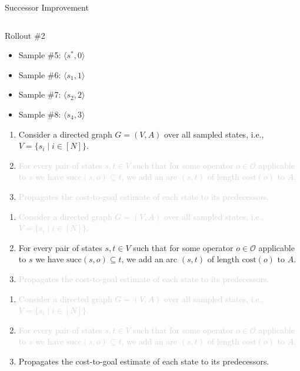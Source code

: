 \documentclass[10pt]{beamer}
\begin{document}
\begin{frame}{Successor Improvement}
\begin{columns}
\begin{column}{0.5\textwidth}
{    Rollout \#2
    \begin{itemize}
        \item Sample \#5: $\langle s^*, 0 \rangle$
        \item Sample \#6: $\langle s_1, 1 \rangle$
        \item Sample \#7: $\langle s_2, 2 \rangle$
        \item Sample \#8: $\langle s_4, 3 \rangle$
    \end{itemize}
}
 {
    \begin{enumerate}
        \item Consider a directed graph $G=(V,A)$ over all sampled states, i.e.,~$V=\{s_i\mid i\in[N]\}$.
        \item \textcolor{lightgray}{For every pair of states $s,t\in V$ such that for some operator $o\in\mathcal{O}$ applicable to $s$ we have $\text{succ}(s,o)\subseteq t$, we add an arc $(s,t)$ of length $\text{cost}(o)$ to $A$.}
        \item \textcolor{lightgray}{Propagates the cost-to-goal estimate of each state to its predecessors.}
    \end{enumerate}
}
 {
    \begin{enumerate}
        \item \textcolor{lightgray}{Consider a directed graph $G=(V,A)$ over all sampled states, i.e.,~$V=\{s_i\mid i\in[N]\}$.}
        \item For every pair of states $s,t\in V$ such that for some operator $o\in\mathcal{O}$ applicable to $s$ we have $\text{succ}(s,o)\subseteq t$, we add an arc $(s,t)$ of length $\text{cost}(o)$ to $A$.
        \item \textcolor{lightgray}{Propagates the cost-to-goal estimate of each state to its predecessors.}
    \end{enumerate}
}
 {
    \begin{enumerate}
        \item \textcolor{lightgray}{Consider a directed graph $G=(V,A)$ over all sampled states, i.e.,~$V=\{s_i\mid i\in[N]\}$.}
        \item \textcolor{lightgray}{For every pair of states $s,t\in V$ such that for some operator $o\in\mathcal{O}$ applicable to $s$ we have $\text{succ}(s,o)\subseteq t$, we add an arc $(s,t)$ of length $\text{cost}(o)$ to $A$.}
        \item Propagates the cost-to-goal estimate of each state to its predecessors.
    \end{enumerate}
}
\end{column}
\end{columns}
\end{frame}
\end{document}
